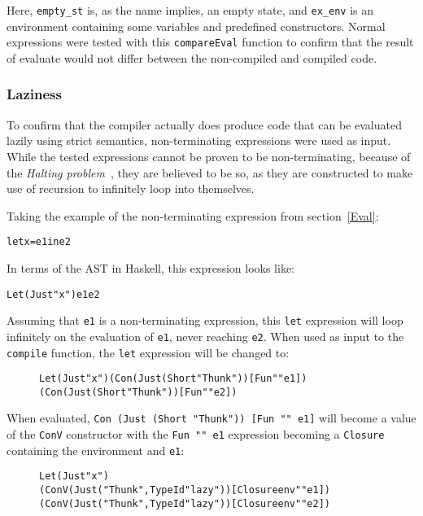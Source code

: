 \noindent Here, \texttt{empty\_st} is, as the name implies, an empty state, and
\texttt{ex\_env} is an environment containing some variables and predefined
constructors. Normal expressions were tested with this \texttt{compareEval}
function to confirm that the result of evaluate would not differ between the
non-compiled and compiled code. 


\subsubsection{Laziness}

To confirm that the compiler actually does produce code that can be evaluated
lazily using strict semantics, non-terminating expressions were used as input.
While the tested expressions cannot be proven to be non-terminating, because of
the \textit{Halting problem}~\cite{haltingproblem}, they are believed to be so,
as they are constructed to make use of recursion to infinitely loop into
themselves.

Taking the example of the non-terminating expression from section~\ref{Eval}:
\begin{alltt}
  let x = e1 in e2
\end{alltt}
In terms of the AST in Haskell, this expression looks like:
\begin{alltt}
  Let (Just "x") e1 e2
\end{alltt}
Assuming that \texttt{e1} is a non-terminating expression, this \texttt{let}
expression will loop infinitely on the evaluation of \texttt{e1}, never reaching
\texttt{e2}. When used as input to the \texttt{compile} function, the
\texttt{let} expression will be changed to:
\begin{figure}[!ht]
\begin{alltt}
  Let (Just "x") (Con (Just (Short "Thunk")) [Fun "" e1])
                 (Con (Just (Short "Thunk")) [Fun "" e2])
\end{alltt}
\end{figure}

\noindent When evaluated, \texttt{Con (Just (Short "Thunk")) [Fun "" e1]} will
become a value of the \texttt{ConV} constructor with the \texttt{Fun "" e1}
expression becoming a \texttt{Closure} containing the environment and
\texttt{e1}:
\begin{figure}[!ht]
\begin{alltt}
  Let (Just "x")
    (ConV (Just ("Thunk",TypeId "lazy")) [Closure env "" e1])
    (ConV (Just ("Thunk",TypeId "lazy")) [Closure env "" e2])
\end{alltt}
\end{figure}

